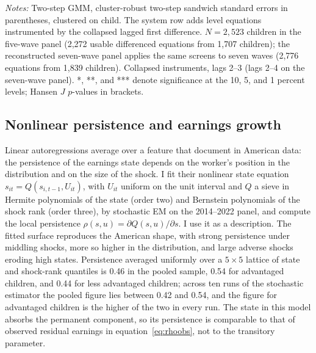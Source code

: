 \documentclass[11pt]{article}
\begin{document}
\begin{table}[t]
\centering
\small
\caption{Arellano--Bond estimates of the persistence of transitory earnings shocks.}
\label{tab:ab}

\par\smallskip
\begin{minipage}{0.92\textwidth}
\footnotesize\emph{Notes:} Two-step GMM, cluster-robust two-step sandwich standard errors in parentheses, clustered on child. The system row adds level equations instrumented by the collapsed lagged first difference. $N = 2{,}523$ children in the five-wave panel (2,272 usable differenced equations from 1,707 children); the reconstructed seven-wave panel applies the same screens to seven waves (2,776 equations from 1,839 children). Collapsed instruments, lags 2--3 (lags 2--4 on the seven-wave panel).
*, **, and *** denote significance at the 10, 5, and 1 percent levels; Hansen $J$ $p$-values in brackets.
\end{minipage}
\end{table}

\subsection{Nonlinear persistence and earnings growth}
\label{sec:abb}

Linear autoregressions average over a feature that
\citet{ArellanoBlundellBonhomme2017} document in American data: the
persistence of the earnings state depends on the worker's position in
the distribution and on the size of the shock. I fit their nonlinear
state equation $s_{it} = Q(s_{i,t-1}, U_{it})$, with $U_{it}$
uniform on the unit interval and $Q$ a sieve in Hermite polynomials
of the state (order two) and Bernstein polynomials of the shock rank
(order three), by stochastic EM on the 2014--2022 panel, and compute
the local persistence
$\rho(s, u) = \partial Q(s, u) / \partial s$. I use it
as a description. The fitted surface reproduces the American shape, with
strong persistence under middling shocks, more so higher in the
distribution, and large adverse shocks eroding high states. Persistence averaged uniformly over a $5 \times 5$ lattice of state
and shock-rank quantiles is 0.46 in the pooled sample, 0.54 for advantaged children, and 0.44 for less advantaged children; across ten runs of the stochastic estimator the pooled figure lies between 0.42 and 0.54, and the figure for advantaged children is the higher of the two in every run. The state in this model absorbs the permanent component, so its persistence is comparable to that of observed residual earnings in equation~\eqref{eq:rhoobs}, not to the transitory parameter.
\end{document}
